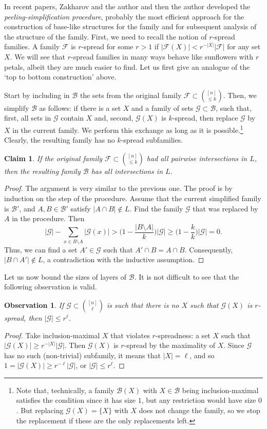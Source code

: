 \documentclass[graybox]{svmult}
\renewcommand{\le}{\leqslant}
\renewcommand{\ge}{\geqslant}
\newcommand{\ff}{\mathcal{F}}
\newcommand{\bb}{\mathcal{B}}
\newcommand{\m}{\mathcal}
\newtheorem{obs}[thm]{Observation}
\newtheorem{cla}[thm]{Claim}
\begin{document}
In recent papers, Zakharov and the author \cite{KuZa} and then the author \cite{Kup54} developed the {\it peeling-simplification procedure},  probably the most efficient approach for the construction of  base-like structures for the family and for subsequent analysis of the structure of the family. First, we need to recall the notion of $r$-spread families. A family $\ff$ is {$r$-spread} for some $r>1$ if $|\ff(X)|< r^{-|X|}|\ff|$ for any set $X$. We will see  that $r$-spread families in many ways behave like sunflowers with $r$ petals, albeit they are much easier to find. Let us first give an analogue of the `top to bottom construction' above.

Start by including in $\m B$ the sets from the original family $\mathcal F\subset {[n]\choose \le k}$. Then, we simplify $\m B$ as follows: if there is a set $X$ and a family of sets $\mathcal G\subset \m B$, such that, first, all sets in $\mathcal G$ contain $X$ and, second, $\mathcal G(X)$ is $k$-spread, then replace $\m G$ by $X$ in the current family. We perform this exchange as long as it is possible.\footnote{Note that, technically, a family $\m B(X)$ with $X\in \m B$ being inclusion-maximal satisfies the condition since it has size $1$, but any restriction would have size $0$. But replacing $\m G(X)= \{X\}$ with $X$ does not change the family, so we stop the replacement if these are the only replacements left.} Clearly, the resulting family has no $k$-spread subfamilies.
\begin{cla} If the original family $\ff\subset {[n]\choose \le k}$ had all pairwise intersections in $L$, then the resulting family $\mathcal B$ has all intersections in $L$.
\end{cla}
\begin{proof}
  The argument is very similar to the previous one. The proof is by induction on the step of the procedure. Assume that the current simplified family is $\bb'$, and $A,B\in \mathcal B'$ satisfy $|A\cap B|\notin L$. Find the family $\mathcal G$ that was replaced by $A$ in the procedure. Then
  $$|\mathcal G|-\sum_{x\in B\setminus A}|\mathcal G(x)|> \Big(1-\frac {|B\setminus A|}k\Big)|\mathcal G|\ge \Big(1-\frac {k}k\Big)|\mathcal G|= 0.$$
    Thus, we can find a set $A'\in \mathcal G$ such that $A'\cap B =A\cap B$. Consequently, $|B\cap A'|\notin L$, a contradiction with the inductive assumption.
\end{proof}

Let us now bound the sizes of layers of $\bb$. It is not difficult to see that the following observation is valid.
\begin{obs}\label{obsspread}
  If $\m G\subset {[n]\choose \ell}$ is such that there is no $X$ such that $\m G(X)$ is $r$-spread, then $|\m G|\le r^\ell$.
\end{obs}
\begin{proof} Take inclusion-maximal $X$ that violates $r$-spreadness: a set $X$ such that $|\m G(X)|\ge r^{-|X|}|\m G|$. Then $\m G(X)$ is $r$-spread by the maximality of $X$. Since $\m G$ has no such (non-trivial) subfamily, it means that $|X| = \ell$, and so $1= |\m G(X)|\ge r^{-\ell}|\m G|$, or $|\m G|\le r^\ell$.
\end{proof}
\end{document}
